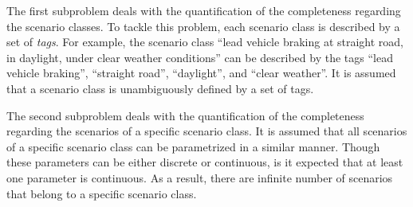 \documentclass[10pt,final,a4paper,oneside,onecolumn]{article}
\theoremstyle{plain}\newtheorem{definition}{Definition}[section]    %
\theoremstyle{definition}\newtheorem{example}{Example}[section]     %
\theoremstyle{remark}\newtheorem{remarkenv}{Remark}[section]        %
\begin{document}
The first subproblem deals with the quantification of the completeness regarding the scenario classes. To tackle this problem, each scenario class is described by a set of \emph{tags}. For example, the scenario class ``lead vehicle braking at straight road, in daylight, under clear weather conditions'' can be described by the tags ``lead vehicle braking'', ``straight road'', ``daylight'', and ``clear weather''. It is assumed that a scenario class is unambiguously defined by a set of tags.

The second subproblem deals with the quantification of the completeness regarding the scenarios of a specific scenario class. It is assumed that all scenarios of a specific scenario class can be parametrized in a similar manner. Though these parameters can be either discrete or continuous, is it expected that at least one parameter is continuous. As a result, there are infinite number of scenarios that belong to a specific scenario class.  


%		
\end{document}
